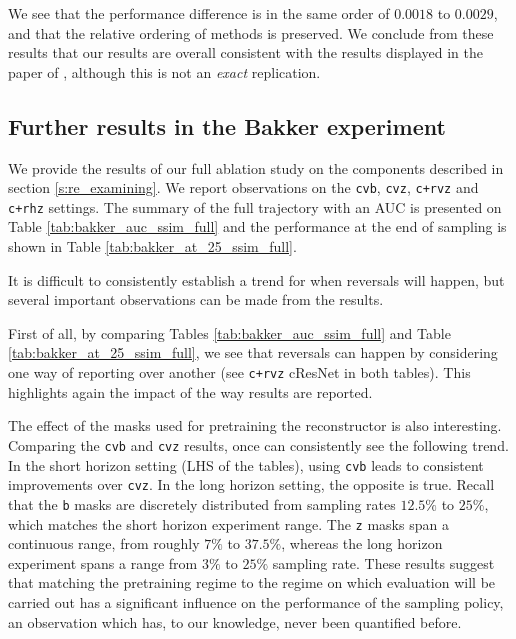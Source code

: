 We see that the performance difference is in the same order of $0.0018$ to $0.0029$, and that the relative ordering of methods is preserved. We conclude from these results that our results are overall consistent with the results displayed in the paper of \citet{bakker2020experimental}, although this is not an \textit{exact} replication.


\subsection{Further results in the Bakker experiment}\label{app:bakker_ablation_full}
We provide the results of our full ablation study on the components described in section \ref{s:re_examining}. We report observations on the \texttt{cvb}, \texttt{cvz}, \texttt{c+rvz} and \texttt{c+rhz} settings. The summary of the full trajectory with an AUC is presented on Table \ref{tab:bakker_auc_ssim_full} and the performance at the end of sampling is shown in Table \ref{tab:bakker_at_25_ssim_full}. 

It is difficult to consistently establish a trend for when reversals will happen, but several important observations can be made from the results.

First of all, by comparing Tables \ref{tab:bakker_auc_ssim_full} and Table \ref{tab:bakker_at_25_ssim_full}, we see that reversals can happen by considering one way of reporting over another (see \texttt{c+rvz} cResNet in both tables). This highlights again the impact of the way results are reported. 

The effect of the masks used for pretraining the reconstructor is also interesting. Comparing the \texttt{cvb} and \texttt{cvz} results, once can consistently see the following trend. In the short horizon setting (LHS of the tables), using \texttt{cvb} leads to consistent improvements over \texttt{cvz}. In the long horizon setting, the opposite is true. Recall that the \texttt{b} masks are discretely distributed from sampling rates $12.5\%$ to $25\%$, which matches the short horizon experiment range. The \texttt{z} masks span a continuous range, from roughly $7\%$ to $37.5\%$, whereas the long horizon experiment spans a range from $3\%$ to $25\%$ sampling rate. These results suggest that matching the pretraining regime to the regime on which evaluation will be carried out has a significant influence on the performance of the sampling policy, an observation which has, to our knowledge, never been quantified before.

